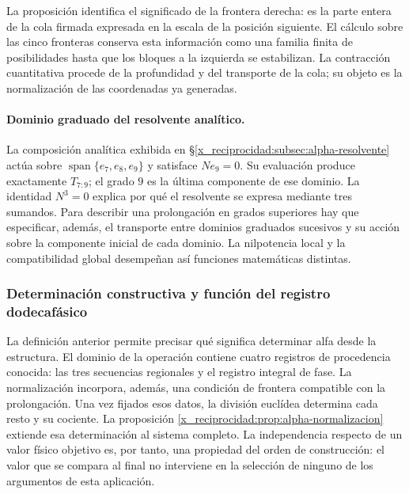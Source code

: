 La proposición identifica el significado de la frontera derecha: es la
parte entera de la cola firmada expresada en la escala de la posición
siguiente. El cálculo sobre las cinco fronteras conserva esta información
como una familia finita de posibilidades hasta que los bloques a la
izquierda se estabilizan. La contracción cuantitativa procede de la
profundidad y del transporte de la cola; su objeto es la normalización de
las coordenadas ya generadas.

\paragraph{Dominio graduado del resolvente analítico.}
\label{x_reciprocidad:ampl-alfa-dominio-resolvente}
La composición analítica exhibida en
\S\ref{x_reciprocidad:subsec:alpha-resolvente} actúa sobre
$\operatorname{span}\{e_7,e_8,e_9\}$ y satisface $Ne_9=0$. Su
evaluación produce exactamente $T_{7:9}$; el grado $9$ es la última
componente de ese dominio. La identidad $N^3=0$ explica por qué el
resolvente se expresa mediante tres sumandos. Para describir una
prolongación en grados superiores hay que especificar, además, el
transporte entre dominios graduados sucesivos y su acción sobre la
componente inicial de cada dominio. La nilpotencia local y la
compatibilidad global desempeñan así funciones matemáticas distintas.




\subsubsection{Determinación constructiva y función del registro dodecafásico}
\label{x_reciprocidad:alpha-ampl-dependencias}

La definición anterior permite precisar qué significa determinar alfa desde
la estructura. El dominio de la operación contiene cuatro registros de
procedencia conocida: las tres secuencias regionales y el registro integral
de fase. La normalización incorpora, además, una condición de frontera
compatible con la prolongación. Una vez fijados esos datos, la división
euclídea determina cada resto y su cociente. La proposición
\ref{x_reciprocidad:prop:alpha-normalizacion} extiende esa determinación al sistema
completo. La independencia respecto de un valor físico objetivo es, por
tanto, una propiedad del orden de construcción: el valor que se compara al
final no interviene en la selección de ninguno de los argumentos de esta
aplicación.

